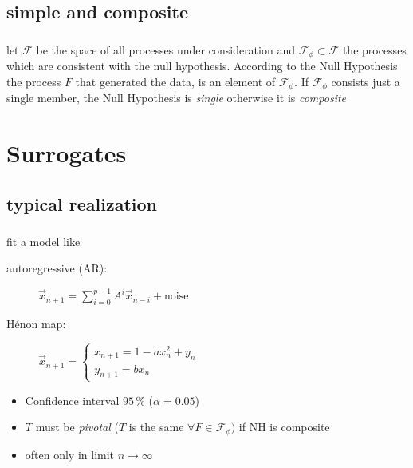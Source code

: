 \subsection{simple and composite}
\begin{frame}
\frametitle{\insertsectionhead}
\framesubtitle{\insertsubsectionhead}
let $\mathcal{F}$ be the space of all processes under consideration and $\mathcal{F}_\phi\subset \mathcal{F}$ the processes which are consistent with the null hypothesis. According to the Null Hypothesis the process $F$ that generated the data, is an element of $\mathcal{F}_\phi$. If $\mathcal{F}_\phi$ consists just a single member, the Null Hypothesis is \textit{single} otherwise it is \textit{composite} \cite{THEILER1996221}
\end{frame}

\section{Surrogates}
\subsection{typical realization}
\begin{frame}
  \frametitle{\insertsectionhead}
  \framesubtitle{\insertsubsectionhead}
  fit a model like
  \begin{description}
    \item[autoregressive (AR):] $\vec{x}_{n+1} = \sum_{i=0}^{p-1} A^i \vec{x}_{n-i} + \mathrm{noise}$
    \item[Hénon map:] $ \vec{x}_{n+1} = \begin{cases} x_{n+1} = 1 - a x_n^2+y_n\\ y_{n+1} = b x_n \end{cases}$
  \end{description}
  \begin{itemize}
    \item Confidence interval $95\,\%$ ($\alpha=0.05$)
    \item $T$ must be \textit{pivotal} ($T$ is the same $\forall F \in \mathcal{F}_\phi)$ if NH is composite
    \item often only in limit $n\to\infty$
  \end{itemize}
\end{frame}

